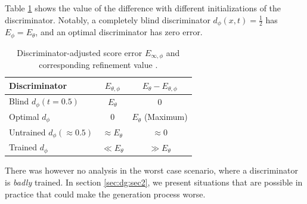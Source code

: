 Table \ref{tab:dg_gain} shows the value of the difference with different initializations of the discriminator. Notably, a completely blind discriminator $d_{\phi}(x,t) = \frac{1}{2}$ has $E_{\phi} = E_{\theta}$, and an optimal discriminator has zero error. 
 \begin{table}[ht]
\centering
\caption{Discriminator-adjusted score error $E_{\infty, \phi}$ and corresponding refinement value \citep{kim2023refininggenerativeprocessdiscriminator}.}
\label{tab:dg_gain}
\begin{tabular}{@{}lcc@{}}
\toprule
Discriminator        & $E_{\theta,\phi}$ & $ E_{\theta} - E_{\theta,\phi}$   \\ \midrule
Blind $d_{\phi} (t = 0.5)$ & $E_{\theta}$      & 0             \\
Optimal $d_{\phi}$  & 0                  & $E_{\theta}$ (Maximum) \\
Untrained $d_{\phi} (\approx 0.5)$ & $\approx E_{\theta}$ & $\approx 0$  \\
Trained $d_{\phi}$  & $\ll E_{\theta}$   & $\gg E_{\theta}$ \\ \bottomrule
\end{tabular}
\end{table}
There was however no analysis in the worst case scenario, where a discriminator is \textit{badly} trained. In section \ref{sec:dg:sec2}, we present situations that are possible in practice that could make the generation process worse.




